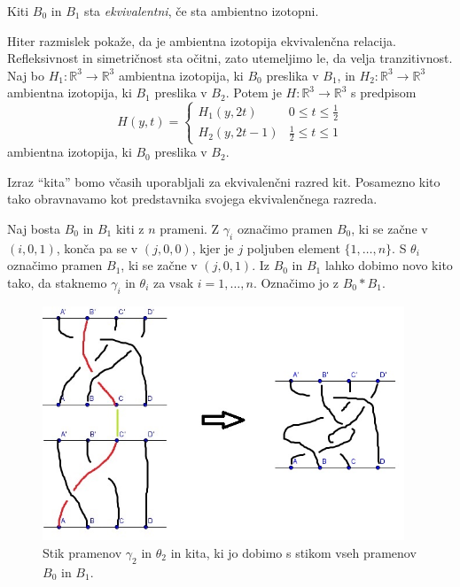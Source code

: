 \documentclass[mat1]{fmfdelo}
\newcommand{\R}{\mathbb R}
\begin{document}
\begin{definicija}
Kiti $B_0$ in $B_1$ sta \emph{ekvivalentni}, če sta ambientno izotopni.
\end{definicija}

\begin{opomba}
Hiter razmislek pokaže, da je ambientna izotopija ekvivalenčna relacija. Refleksivnost in simetričnost sta očitni, zato utemeljimo le, da velja tranzitivnost. Naj bo $H_1: \R^3 \rightarrow \R^3$ ambientna izotopija, ki $B_0$ preslika v $B_1$, in $H_2: \R^3 \rightarrow \R^3$ ambientna izotopija, ki $B_1$ preslika v $B_2$. Potem je $H: \R^3 \rightarrow \R^3$ s predpisom
\[ H(y,t) = \begin{cases} 
      H_1(y,2t)  &  0 \leq t \leq \frac{1}{2} \\
      H_2(y,2t-1) & \frac{1}{2}\leq t \leq 1 
   \end{cases}
\]
ambientna izotopija, ki $B_0$ preslika v $B_2$.
\end{opomba}

\begin{opomba}
Izraz ``kita'' bomo včasih uporabljali za ekvivalenčni razred kit. Posamezno kito tako obravnavamo kot predstavnika svojega ekvivalenčnega razreda.
\end{opomba}

Naj bosta $B_0$ in $B_1$ kiti z $n$ prameni. Z $\gamma_i$ označimo pramen $B_0$, ki se začne v $(i, 0, 1)$, konča pa se v $(j, 0, 0)$, kjer je $j$ poljuben element $\{1, \ldots, n\}$. S $\theta_i$ označimo pramen $B_1$, ki se začne v $(j, 0, 1)$. Iz $B_0$ in $B_1$ lahko dobimo novo kito tako, da staknemo $\gamma_i$ in $\theta_i$ za vsak $i=1, \ldots, n$.  Označimo jo z $B_0*B_1$.

\begin{figure}[ht!]
\includegraphics[height = 7cm]{Stikanje_2}
\caption{Stik pramenov $\gamma_2$ in $\theta_2$ in kita, ki jo dobimo s stikom vseh pramenov $B_0$ in $B_1$.}
\end{figure}
\end{document}
